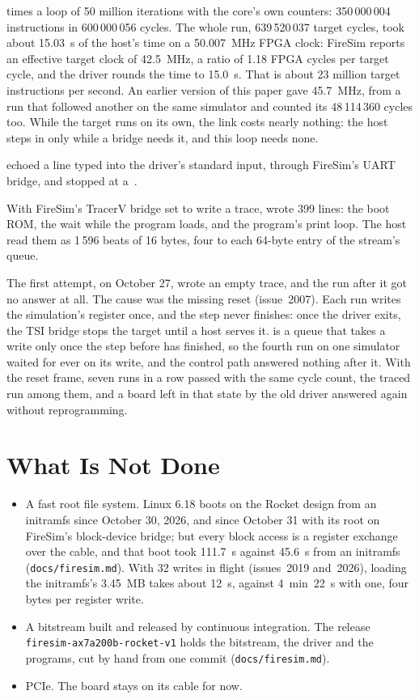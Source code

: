 \documentclass[journal,9pt]{IEEEtran}
\begin{document}
 times a loop of 50 million iterations with the
core's own counters: 350\,000\,004 instructions in 600\,000\,056 cycles.
The whole run, 639\,520\,037 target cycles, took about 15.03~s of the
host's time on a 50.007~MHz FPGA clock: FireSim reports an effective
target clock of 42.5~MHz, a ratio of 1.18 FPGA cycles per target cycle,
and the driver rounds the time to 15.0~s. That is about 23 million
target instructions per second. An earlier version of this paper gave
45.7~MHz, from a run that followed another on the same simulator and
counted its 48\,114\,360 cycles too. While the target runs on its
own, the link costs nearly nothing: the host steps in only while a
bridge needs it, and this loop needs none.

 echoed a line typed into the driver's standard input,
through FireSim's UART bridge, and stopped at a~.

With FireSim's TracerV bridge set to write a trace, 
wrote 399 lines: the boot ROM, the wait while the program loads, and
the program's print loop. The host read them as 1\,596 beats of 16
bytes, four to each 64-byte entry of the stream's queue.

The first attempt, on October 27, wrote an empty trace, and the run
after it got no answer at all. The cause was the missing reset
(issue~2007). Each run writes the simulation's  register
once, and the step never finishes: once the driver exits, the TSI bridge
stops the target until a host serves it.  is a queue that
takes a write only once the step before has finished, so the fourth run
on one simulator waited for ever on its write, and the control path
answered nothing after it. With the reset frame, seven runs in a row
passed with the same cycle count, the traced run among them, and a
board left in that state by the old driver answered again without
reprogramming.

\section{What Is Not Done}
\label{sec:f-not}

\begin{itemize}
\item A fast root file system. Linux 6.18 boots on the Rocket design
from an initramfs since October 30, 2026, and since October 31 with its
root on FireSim's block-device bridge; but every block access is a
register exchange over the cable, and that boot took 111.7~s against
45.6~s from an initramfs (\texttt{docs/firesim.md}).
With 32 writes in flight (issues~2019 and~2026), loading the
initramfs's 3.45~MB takes about 12~s, against 4~min~22~s with one, four
bytes per register write.
\item A bitstream built and released by continuous integration. The
release \texttt{firesim-ax7a200b-rocket-v1} holds the bitstream, the
driver and the programs, cut by hand from one commit
(\texttt{docs/firesim.md}).
\item PCIe. The board stays on its cable for now.
\end{itemize}
\end{document}
